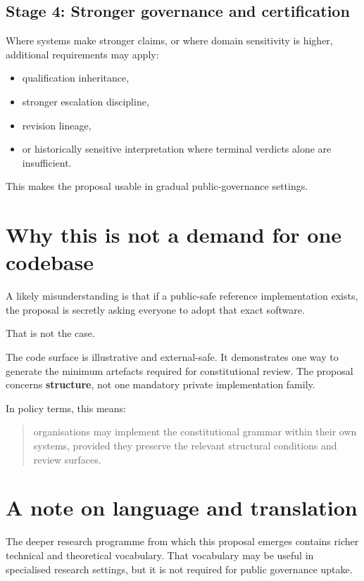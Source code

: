 \documentclass[11pt]{article}
\begin{document}
\subsection*{Stage 4: Stronger governance and certification}
Where systems make stronger claims, or where domain sensitivity is higher, additional requirements may apply:
\begin{itemize}[leftmargin=2em]
    \item qualification inheritance,
    \item stronger escalation discipline,
    \item revision lineage,
    \item or historically sensitive interpretation where terminal verdicts alone are insufficient.
\end{itemize}

This makes the proposal usable in gradual public-governance settings.

\section{Why this is not a demand for one codebase}

A likely misunderstanding is that if a public-safe reference implementation exists, the proposal is secretly asking everyone to adopt that exact software.

That is not the case.

The code surface is illustrative and external-safe. It demonstrates one way to generate the minimum artefacts required for constitutional review. The proposal concerns \textbf{structure}, not one mandatory private implementation family.

In policy terms, this means:
\begin{quote}
organisations may implement the constitutional grammar within their own systems, provided they preserve the relevant structural conditions and review surfaces.
\end{quote}

\section{A note on language and translation}

The deeper research programme from which this proposal emerges contains richer technical and theoretical vocabulary. That vocabulary may be useful in specialised research settings, but it is not required for public governance uptake.
\end{document}
